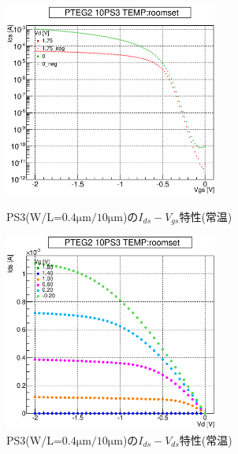 				\begin{figure}[htbp]
					\begin{minipage}{0.5\hsize}
						\begin{center}
							\includegraphics[width=70mm]{./Chapter/Appendix/Picture/PST/PS3/PTEG2_10_PS3_IdVg_roomset.eps}
						\end{center}
						\caption{PS3(W/L=$0.4\mathrm{\mu m}/10\mathrm{\mu m}$)の$I_{ds}-V_{gs}$特性(常温)}
						\label{fig:PS3_IdVg_room}
					\end{minipage}
					\begin{minipage}{0.5\hsize}
						\begin{center}
							\includegraphics[width=70mm]{./Chapter/Appendix/Picture/PST/PS3/PTEG2_10_PS3_IdVd_roomset.eps}
						\end{center}
						\caption{PS3(W/L=$0.4\mathrm{\mu m}/10\mathrm{\mu m}$)の$I_{ds}-V_{ds}$特性(常温)}
						\label{fig:PS3_IdVd_room}
					\end{minipage}
				\end{figure}
